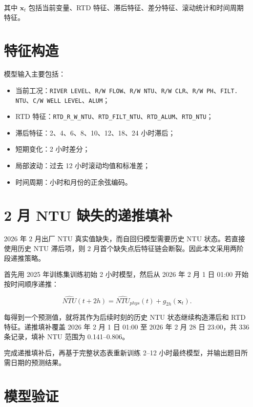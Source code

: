 \documentclass[UTF8,a4paper,12pt]{ctexart}
\begin{document}
其中 $\mathbf{x}_t$ 包括当前变量、RTD 特征、滞后特征、差分特征、滚动统计和时间周期特征。

\section{特征构造}

模型输入主要包括：

\begin{itemize}
  \item 当前工况：\texttt{RIVER LEVEL}、\texttt{R/W FLOW}、\texttt{R/W NTU}、\texttt{R/W CLR}、\texttt{R/W PH}、\texttt{FILT. NTU}、\texttt{C/W WELL LEVEL}、\texttt{ALUM}；
  \item RTD 特征：\texttt{RTD\_R\_W\_NTU}、\texttt{RTD\_FILT\_NTU}、\texttt{RTD\_ALUM}、\texttt{RTD\_NTU}；
  \item 滞后特征：2、4、6、8、10、12、18、24 小时滞后；
  \item 短期变化：2 小时差分；
  \item 局部波动：过去 12 小时滚动均值和标准差；
  \item 时间周期：小时和月份的正余弦编码。
\end{itemize}

\section{2 月 NTU 缺失的递推填补}

2026 年 2 月出厂 NTU 真实值缺失，而自回归模型需要历史 NTU 状态。若直接使用历史 NTU 滞后项，则 2 月首个缺失点后特征链会断裂。因此本文采用两阶段递推策略。

首先用 2025 年训练集训练初始 2 小时模型，然后从 2026 年 2 月 1 日 01:00 开始按时间顺序递推：

\begin{equation}
\widehat{NTU}(t+2h)=\widehat{NTU}_{phys}(t)+g_{2h}(\mathbf{x}_t).
\end{equation}

每得到一个预测值，就将其作为后续时刻的历史 NTU 状态继续构造滞后和 RTD 特征。递推填补覆盖 2026 年 2 月 1 日 01:00 至 2026 年 2 月 28 日 23:00，共 336 条记录，填补 NTU 范围为 0.141--0.806。

完成递推填补后，再基于完整状态表重新训练 2--12 小时最终模型，并输出题目所需日期的预测结果。

\section{模型验证}
\end{document}
